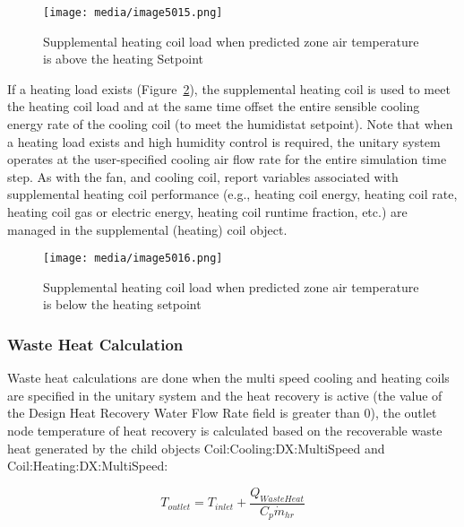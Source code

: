 \begin{figure}[hbtp] %
\centering
\texttt{[image: media/image5015.png]}
\caption{Supplemental heating coil load when predicted zone air temperature is above the heating Setpoint \protect \label{fig:supplemental-heating-coil-load-when-predicted}}
\end{figure}

If a heating load exists (Figure~\ref{fig:supplemental-heating-coil-load-when-predicted-001}), the supplemental heating coil is used to meet the heating coil load and at the same time offset the entire sensible cooling energy rate of the cooling coil (to meet the humidistat setpoint). Note that when a heating load exists and high humidity control is required, the unitary system operates at the user-specified cooling air flow rate for the entire simulation time step. As with the fan, and cooling coil, report variables associated with supplemental heating coil performance (e.g., heating coil energy, heating coil rate, heating coil gas or electric energy, heating coil runtime fraction, etc.) are managed in the supplemental (heating) coil object.

\begin{figure}[hbtp] %
\centering
\texttt{[image: media/image5016.png]}
\caption{Supplemental heating coil load when predicted zone air temperature is below the heating setpoint \protect \label{fig:supplemental-heating-coil-load-when-predicted-001}}
\end{figure}

\subsubsection{Waste Heat Calculation}\label{waste-heat-calculation}

Waste heat calculations are done when the multi speed cooling and heating coils are specified in the unitary system and the heat recovery is active (the value of the Design Heat Recovery Water Flow Rate field is greater than 0), the outlet node temperature of heat recovery is calculated based on the recoverable waste heat generated by the child objects Coil:Cooling:DX:MultiSpeed and Coil:Heating:DX:MultiSpeed:

\begin{equation}
{T_{outlet}} = {T_{inlet}} + \frac{{{Q_{WasteHeat}}}}{{{C_p}{{\dot m}_{hr}}}}
\end{equation}

